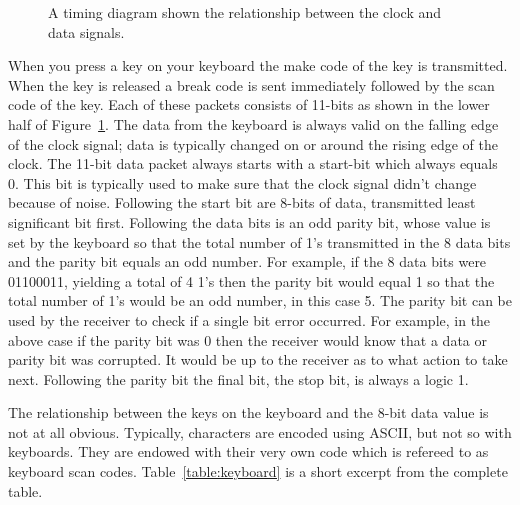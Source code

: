 \begin{figure}[ht]
\caption{A timing diagram shown the relationship between the
clock and data signals.}
\label{fig:keyboard}
\end{figure}

When you press a key on your keyboard the make code of the key is 
transmitted.  When the key is released a break code is sent immediately 
followed by the scan code of the key.  Each of these packets consists
of 11-bits as shown in the lower half of Figure~\ref{fig:keyboard}.
The data from the keyboard is always valid on the falling edge of the
clock signal; data is typically changed on or around the rising edge
of the clock.  The 11-bit data packet always starts with a start-bit
which always equals 0.  This bit is typically used to make sure that 
the clock signal didn't change because of noise.  Following the
start bit are 8-bits of data, transmitted least significant bit first.
Following the data bits is an odd parity bit, whose value is set by the 
keyboard so that the total number of 1's transmitted in the 8 data
bits and the parity bit equals an odd number.  For example, if the
8 data bits were 01100011, yielding a total of 4 1's then the parity
bit would equal 1 so that the total number of 1's would be an odd
number, in this case 5.  The parity bit can be used by the receiver
to check if a single bit error occurred.  For example, in the above 
case if the parity bit was 0 then the receiver would know that a data
or parity bit was corrupted.  It would be up to the receiver as
to what action to take next.  Following the parity bit the final
bit, the stop bit, is always a logic 1.

The relationship between the keys on the keyboard and the 8-bit data
value is not at all obvious.  Typically, characters are encoded using
ASCII, but not so with keyboards.  They are endowed with their very
own code which is refereed to as keyboard scan codes.  
Table~\ref{table:keyboard} is a short excerpt from the complete table.


